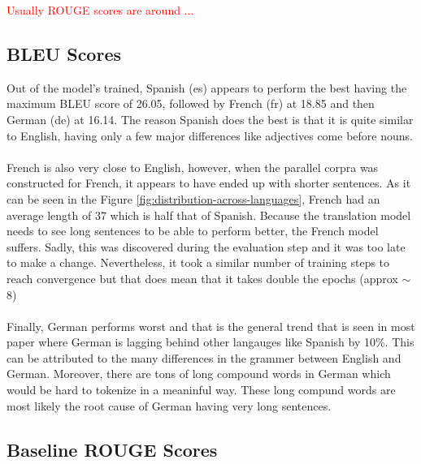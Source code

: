 \documentclass[12pt,a4paper,twoside,openright]{report}
\newcommand{\red}[1]{\textcolor{red}{#1}}
\begin{document}
\red{Usually ROUGE scores are around ...}

\subsection{BLEU Scores}

Out of the model's trained, Spanish (es) appears to perform the best having the maximum BLEU score of 26.05, followed by French (fr) at 18.85 and then German (de) at 16.14. The reason Spanish does the best is that it is quite similar to English, having only a few major differences like adjectives come before nouns. \\\\
French is also very close to English, however, when the parallel corpra was constructed for French, it appears to have ended up with shorter sentences. As it can be seen in the Figure \ref{fig:distribution-across-languages}, French had an average length of 37 which is half that of Spanish. Because the translation model needs to see long sentences to be able to perform better, the French model suffers. Sadly, this was discovered during the evaluation step and it was too late to make a change. Nevertheless, it took a similar number of training steps to reach convergence but that does mean that it takes double the epochs (approx $\sim$ 8) \\\\
Finally, German performs worst and that is the general trend that is seen in most paper where German is lagging behind other langauges like Spanish by 10\%.  This can be attributed to the many differences in the grammer between English and German. Moreover, there are tons of long compound words in German which would be hard to tokenize in a meaninful way. These long compund words are most likely the root cause of German having very long sentences.



\subsection{Baseline ROUGE Scores}
\end{document}
